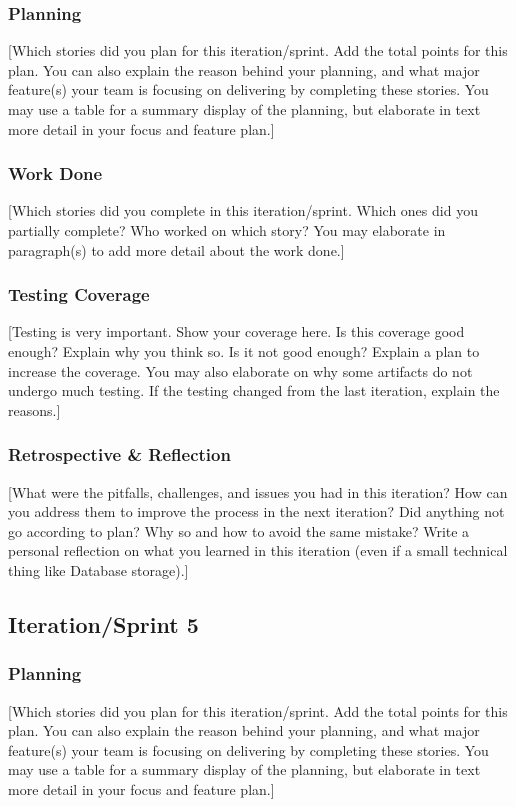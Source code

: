 \documentclass{article}
\begin{document}
\subsubsection{Planning}
[Which stories did you plan for this iteration/sprint. Add the total points for this plan. You can also explain the reason behind your planning, and what major feature(s) your team is focusing on delivering by completing these stories. You may use a table for a summary display of the planning, but elaborate in text more detail in your focus and feature plan.]

\subsubsection{Work Done}
[Which stories did you complete in this iteration/sprint. Which ones did you partially complete? Who worked on which story? You may elaborate in paragraph(s) to add more detail about the work done.]

\subsubsection{Testing Coverage}
[Testing is very important. Show your coverage here. Is this coverage good enough? Explain why you think so. Is it not good enough? Explain a plan to increase the coverage. You may also elaborate on why some artifacts do not undergo much testing. If the testing changed from the last iteration, explain the reasons.]

\subsubsection{Retrospective \& Reflection}
[What were the pitfalls, challenges, and issues you had in this iteration? How can you address them to improve the process in the next iteration? Did anything not go according to plan? Why so and how to avoid the same mistake? Write a personal reflection on what you learned in this iteration (even if a small technical thing like Database storage).]

\subsection{Iteration/Sprint 5}
\subsubsection{Planning}
[Which stories did you plan for this iteration/sprint. Add the total points for this plan. You can also explain the reason behind your planning, and what major feature(s) your team is focusing on delivering by completing these stories. You may use a table for a summary display of the planning, but elaborate in text more detail in your focus and feature plan.]
\end{document}
